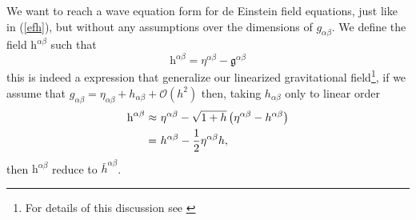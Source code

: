 We want to reach a wave equation form for de Einstein field equations,
just like in (\ref{efh}), but without any assumptions over the dimensions
of $g_{\alpha\beta}$. We define the field $\text{h}^{\alpha\beta}$
such that
\begin{equation}
\text{h}^{\alpha\beta}=\eta^{\alpha\beta}-\mathfrak{g}^{\alpha\beta}\label{eq:h-general}
\end{equation}
this is indeed a expression that generalize our linearized gravitational
field\footnote{For details of this discussion see \cite{THORNE-GR}}, if we
assume that $g_{\alpha\beta}=\eta_{\alpha\beta}+h_{\alpha\beta}+\mathcal{O}\left(h^{2}\right)$
then, taking $h_{\alpha\beta}$ only to linear order
\begin{align*}
\text{h}^{\alpha\beta}\approx & \ \eta^{\alpha\beta}-\sqrt{1+h}\left(\eta^{\text{\ensuremath{\alpha\beta}}}-h^{\alpha\beta}\right)\\
= & \ h^{\alpha\beta}-\frac{1}{2}\eta^{\alpha\beta}h,
\end{align*}
then $\text{h}^{\alpha\beta}$ reduce to $\bar{h}^{\alpha\beta}$. 

